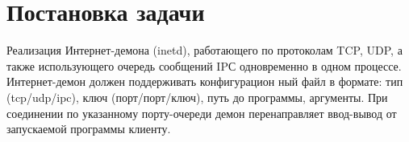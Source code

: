 ﻿\section{Постановка задачи}

	Реализация Интернет-демона (inetd), работающего по протоколам
TCP, UDP, а также использующего очередь сообщений IPС одновременно
в одном процессе. Интернет-демон должен поддерживать конфигурацион
ный файл в формате: тип (tcp/udp/ipc), ключ (порт/порт/ключ), путь
до программы, аргументы. При соединении по указанному порту-очереди
демон перенаправляет ввод-вывод от запускаемой программы клиенту.

\endinput
